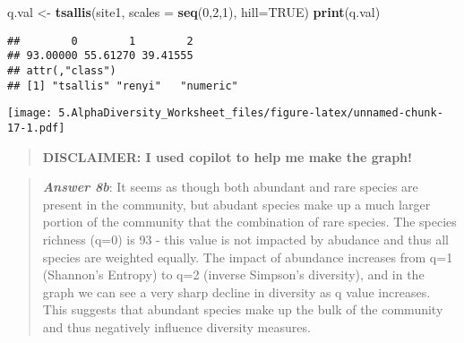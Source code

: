 \documentclass[
]{article}
\newenvironment{Shaded}{\begin{snugshade}}{\end{snugshade}}
\newcommand{\AttributeTok}[1]{\textcolor[rgb]{0.13,0.29,0.53}{#1}}
\newcommand{\ConstantTok}[1]{\textcolor[rgb]{0.56,0.35,0.01}{#1}}
\newcommand{\DecValTok}[1]{\textcolor[rgb]{0.00,0.00,0.81}{#1}}
\newcommand{\FunctionTok}[1]{\textcolor[rgb]{0.13,0.29,0.53}{\textbf{#1}}}
\newcommand{\NormalTok}[1]{#1}
\newcommand{\OtherTok}[1]{\textcolor[rgb]{0.56,0.35,0.01}{#1}}
\newcommand{\SpecialCharTok}[1]{\textcolor[rgb]{0.81,0.36,0.00}{\textbf{#1}}}
\newcommand{\StringTok}[1]{\textcolor[rgb]{0.31,0.60,0.02}{#1}}
\begin{document}
\begin{Shaded}
\begin{Highlighting}[]
\NormalTok{q.val }\OtherTok{\textless{}{-}} \FunctionTok{tsallis}\NormalTok{(site1, }\AttributeTok{scales =} \FunctionTok{seq}\NormalTok{(}\DecValTok{0}\NormalTok{,}\DecValTok{2}\NormalTok{,}\DecValTok{1}\NormalTok{), }\AttributeTok{hill=}\ConstantTok{TRUE}\NormalTok{)}
\FunctionTok{print}\NormalTok{(q.val)}
\end{Highlighting}
\end{Shaded}

\begin{verbatim}
##        0        1        2 
## 93.00000 55.61270 39.41555 
## attr(,"class")
## [1] "tsallis" "renyi"   "numeric"
\end{verbatim}

\begin{Shaded}
\end{Shaded}

\texttt{[image: 5.AlphaDiversity\_Worksheet\_files/figure-latex/unnamed-chunk-17-1.pdf]}

\begin{quote}
\textbf{DISCLAIMER: I used copilot to help me make the graph!}
\end{quote}

\begin{quote}
\textbf{\emph{Answer 8b}}: It seems as though both abundant and rare
species are present in the community, but abudant species make up a much
larger portion of the community that the combination of rare species.
The species richness (q=0) is 93 - this value is not impacted by
abudance and thus all species are weighted equally. The impact of
abundance increases from q=1 (Shannon's Entropy) to q=2 (inverse
Simpson's diversity), and in the graph we can see a very sharp decline
in diversity as q value increases. This suggests that abundant species
make up the bulk of the community and thus negatively influence
diversity measures.
\end{quote}
\end{document}
